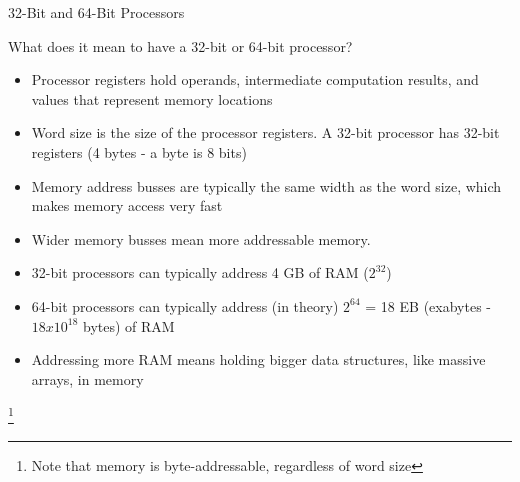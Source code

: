 \documentclass{beamer}
\begin{document}
\begin{frame}{32-Bit  and 64-Bit Processors}

What does it mean to have a 32-bit or 64-bit processor?
\begin{itemize}
\item Processor registers hold operands, intermediate computation
  results, and values that represent memory locations
\item Word size is the size of the processor registers.  A 32-bit
  processor has 32-bit registers (4 bytes - a byte is 8 bits)
\item Memory address busses are typically the same width as the word
  size, which makes memory access very fast
\item Wider memory busses mean more addressable memory.
\item 32-bit processors can typically address 4 GB of RAM
  ($2^{32}$)
\item 64-bit processors can typically address (in theory) $2^{64}$ =
  18 EB (exabytes - $18x10^{18}$ bytes) of RAM
\item Addressing more RAM means holding bigger data structures, like
  massive arrays, in memory
\end{itemize}
\footnote{Note that memory is byte-addressable, regardless
  of word size}
\end{frame}
\end{document}
